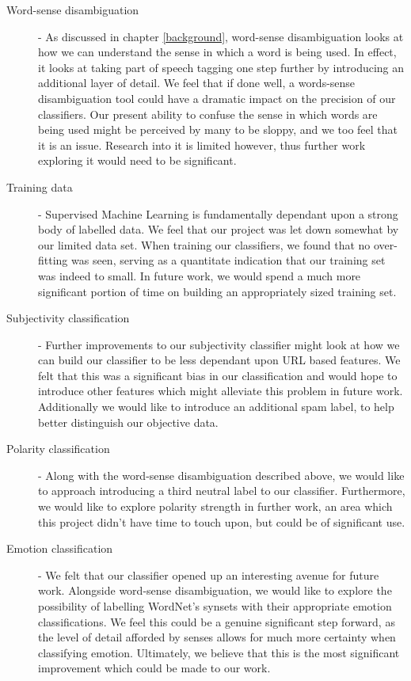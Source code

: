 \begin{description}
	\item [Word-sense disambiguation] - As discussed in chapter \ref{background}, word-sense disambiguation looks at how we can understand the sense in which a word is being used. In effect, it looks at taking part of speech tagging one step further by introducing an additional layer of detail. We feel that if done well, a words-sense disambiguation tool could have a dramatic impact on the precision of our classifiers. Our present ability to confuse the sense in which words are being used might be perceived by many to be sloppy, and we too feel that it is an issue. Research into it is limited however, thus further work exploring it would need to be significant.
	\item [Training data] - Supervised Machine Learning is fundamentally dependant upon a strong body of labelled data. We feel that our project was let down somewhat by our limited data set. When training our classifiers, we found that no over-fitting was seen, serving as a quantitate indication that our training set was indeed to small. In future work, we would spend a much more significant portion of time on building an appropriately sized training set. 
	\item [Subjectivity classification] - Further improvements to our subjectivity classifier might look at how we can build our classifier to be less dependant upon URL based features. We felt that this was a significant bias in our classification and would hope to introduce other features which might alleviate this problem in future work. Additionally we would like to introduce an additional spam label, to help better distinguish our objective data.
	\item [Polarity classification] - Along with the word-sense disambiguation described above, we would like to approach introducing a third neutral label to our classifier. Furthermore, we would like to explore polarity strength in further work, an area which this project didn't have time to touch upon, but could be of significant use.
	\item [Emotion classification] - We felt that our classifier opened up an interesting avenue for future work. Alongside word-sense disambiguation, we would like to explore the possibility of labelling WordNet's synsets with their appropriate emotion classifications. We feel this could be a genuine significant step forward, as the level of detail afforded by senses allows for much more certainty when classifying emotion. Ultimately, we believe that this is the most significant improvement which could be made to our work.
\end{description}
